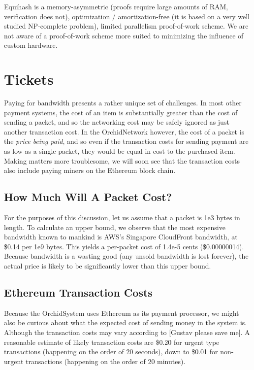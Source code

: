 \documentclass{article}
\newcommand{\orchid}{Orchid}
\newcommand{\Orchid}{\orchid}
\begin{document}
Equihash is a memory-asymmetric (proofs require large amounts of RAM,
verification does not), optimization / amortization-free (it is based on
a very well studied NP-complete problem), limited parallelism
proof-of-work scheme. We are not aware of a proof-of-work scheme more
suited to minimizing the influence of custom hardware.

\section{Tickets}
\label{sec:tickets}

Paying for bandwidth presents a rather unique set of challenges. In most other payment systems, the cost of an item is substantially greater than the cost of sending a packet, and so the networking cost may be safely ignored as just another transaction cost. In the \Orchid Network however, the cost of a packet is the \emph{price being paid}, and so even if the transaction costs for sending payment are as low as a single packet, they would be equal in cost to the purchased item. Making matters more troublesome, we will soon see that the transaction costs also include paying miners on the Ethereum block chain.

\subsection{How Much Will A Packet Cost?}

For the purposes of this discussion, let us assume that a packet is 1e3 bytes in length. To calculate an upper bound, we observe that the most expensive bandwidth known to mankind is AWS's Singapore CloudFront bandwidth, at \$0.14 per 1e9 bytes. This yields a per-packet cost of 1.4e-5 cents (\$0.00000014). Because bandwidth is a wasting good (any unsold bandwidth is lost forever), the actual price is likely to be significantly lower than this upper bound.

\subsection{Ethereum Transaction Costs}

Because the \Orchid System uses Ethereum as its payment processor, we might also be curious about what the expected cost of sending money in the system is. Although the transaction costs may vary according to [Gustav please save me]. A reasonable estimate of likely transaction costs are \$0.20 for urgent type transactions (happening on the order of 20 seconds), down to \$0.01 for non-urgent transactions (happening on the order of 20 minutes).
\end{document}
